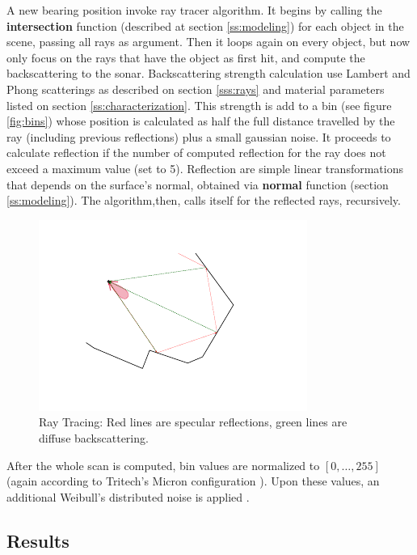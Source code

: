 A new bearing position invoke ray tracer algorithm. It begins by calling
the \textbf{intersection} function (described at section \ref{ss:modeling}) for
each object in the scene, passing all rays as argument. Then it loops again on every
object, but now only focus on the rays that have the object as first hit, and
compute the backscattering to the sonar. Backscattering strength calculation use
Lambert and Phong scatterings as described on section \ref{sss:rays} and material
parameters listed on section \ref{ss:characterization}. This strength is add to
a bin (see figure \ref{fig:bins}) whose position is calculated as half the full
distance travelled by the ray (including previous reflections) plus a small
gaussian noise. It proceeds to calculate reflection if the number of computed
reflection for the ray does not exceed a maximum value (set to 5). Reflection
are simple linear transformations that depends on the surface's normal, obtained
via \textbf{normal} function (section \ref{ss:modeling}). The algorithm,then,
calls itself for the reflected rays, recursively.

\begin{figure}
	\centering
	\includegraphics[scale=2.5, trim={20 20 20 20}, clip]{Chap2/fig/method.pdf}
	\caption{Ray Tracing: Red lines are specular reflections, green lines are diffuse backscattering.}
	\label{fig:methodtrace}
\end{figure}

After the whole scan is computed, bin values are normalized to $[0,\ldots,255]$
(again according to Tritech's Micron configuration ). Upon these values, an
additional Weibull's distributed noise is applied \cite{maussang2007mean}.

\subsection{Results}
\label{ss:results}

